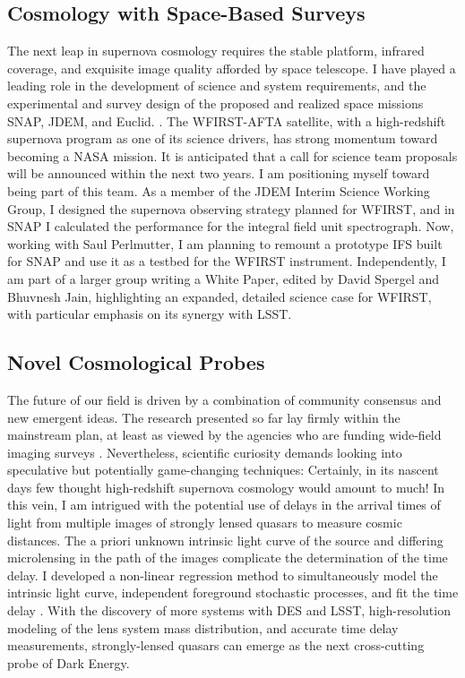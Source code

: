 \documentclass{article}
\begin{document}
\subsection{Cosmology with Space-Based Surveys}
The next leap in supernova cosmology requires the stable platform, infrared coverage, and exquisite image
quality afforded by space telescope.  I have played a leading role in the development
of science and system requirements, and the experimental and survey design of the proposed
and realized space missions SNAP, JDEM, and Euclid.
\cite{2006PASP..118..205D, 2011PASP..123..470S, 2013Fourspring, 2014arXiv1409.8562A}.
The WFIRST-AFTA satellite, with a high-redshift supernova program as one of its science 
drivers, has strong momentum toward becoming a NASA mission.  It is anticipated that a call for science team
proposals will be announced within the next two years.  I am positioning myself toward being part of
this team.  As a member of the JDEM Interim Science Working Group, I designed the
supernova observing strategy planned for WFIRST, and in SNAP I calculated the performance for the integral
field unit spectrograph.  Now, working with Saul Perlmutter,
I am planning to remount a prototype IFS built for SNAP and use it as a testbed for
the WFIRST instrument.  Independently, I am part of a larger group writing a White Paper, edited by David Spergel and Bhuvnesh
Jain, highlighting an expanded, detailed science case for WFIRST, with particular emphasis
on its synergy with LSST.

\subsection{Novel Cosmological Probes}
The future of our field is driven by a combination of community consensus and new emergent ideas.
The research presented so far  lay firmly within the
mainstream plan, at least as viewed by the agencies who are funding wide-field imaging surveys
\cite{2013arXiv1309.5386D,2013arXiv1309.5382K}.
Nevertheless, scientific curiosity demands looking into speculative but potentially game-changing
techniques:  Certainly, in its nascent days few thought high-redshift supernova cosmology would amount to much!
In this vein, I am intrigued with the potential use of delays in the arrival times of light from multiple images
of strongly lensed quasars to measure cosmic distances.  The a priori unknown intrinsic light curve of the source and differing microlensing
in the path of the images complicate the determination of the time delay.  I developed a
non-linear regression method to simultaneously model the intrinsic light curve, independent foreground
stochastic processes, and fit the time delay \cite{2013PhRvD..87l3512H}.  With the discovery of more 
systems with DES and LSST, high-resolution modeling of the lens system mass distribution, and accurate
time delay measurements, strongly-lensed
quasars can emerge as the next cross-cutting probe of Dark Energy.
\end{document}
